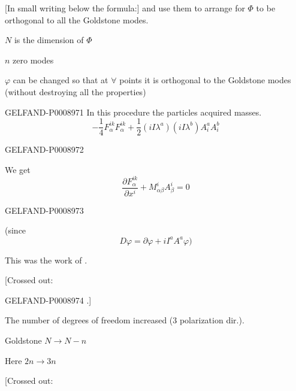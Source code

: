 [In small writing below the formula:] and use them to arrange for $\Phi$ to be orthogonal to all the Goldstone modes.

$N$ is the dimension of $\Phi$

$n$ zero modes

$\varphi$ can be changed so that at $\forall$ points it is orthogonal to the Goldstone modes (without destroying all the properties)


\begin{GelfandAdjacentEvidence}{GELFAND-P000897}{1}
In this procedure the particles acquired masses.
\begin{equation*}
-\frac14F_\alpha^{ik}F_\alpha^{ik}
+\frac12(iI\lambda^a)(iI\lambda^b)A_i^aA_i^b
\tag{28}
\end{equation*}
\end{GelfandAdjacentEvidence}
\begin{GelfandAdjacentEvidence}{GELFAND-P000897}{2}


We get
\begin{equation*}
\frac{\partial F_\alpha^{ik}}{\partial x^i}
+M_{\alpha\beta}^i A_\beta^i=0 \tag{29}
\end{equation*}
\end{GelfandAdjacentEvidence}
\begin{GelfandAdjacentEvidence}{GELFAND-P000897}{3}


(since
\begin{equation*}
D\varphi=\partial\varphi+iI^aA^a\varphi) \tag{30}
\end{equation*}

This was the work of .

[Crossed out: 
\end{GelfandAdjacentEvidence}
\begin{GelfandAdjacentEvidence}{GELFAND-P000897}{4}
.]

The number of degrees of freedom increased 
(3 polarization dir.).

Goldstone $N\to N-n$

Here $2n\to3n$

[Crossed out: 
\end{GelfandAdjacentEvidence}
